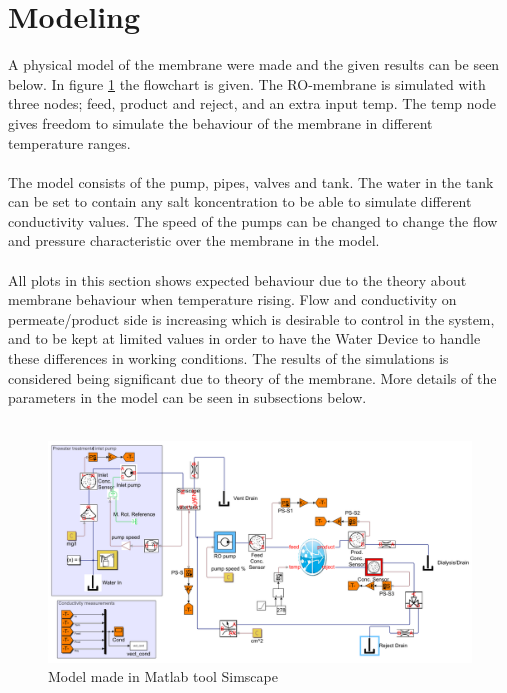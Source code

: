 \section{Modeling}
\label{sec:modres}
A physical model of the membrane were made and the given results can be seen below. In figure \ref{fig:simscape} the flowchart is given. The RO-membrane is simulated with three nodes; feed, product and reject, and an extra input temp. The temp node gives freedom to simulate the behaviour of the membrane in different temperature ranges. \\
\\
The model consists of the pump, pipes, valves and tank. The water in the tank can be set to contain any salt koncentration to be able to simulate different conductivity values. The speed of the pumps can be changed to change the flow and pressure characteristic over the membrane in the model. \\
\\
All plots in this section shows expected behaviour due to the theory about membrane behaviour when temperature rising. Flow and conductivity on permeate/product side is increasing which is desirable to control in the system, and to be kept at limited values in order to have the Water Device to handle these differences in working conditions. The results of the simulations is considered being significant due to theory of the membrane. More details of the parameters in the model can be seen in subsections below.\\
\\
\begin{figure}[h]
\label{fig:simscape}
\centering
\includegraphics[width=\textwidth]{simscape_fc1.PNG}
\caption{Model made in Matlab tool Simscape }
\end{figure}
\newpage


